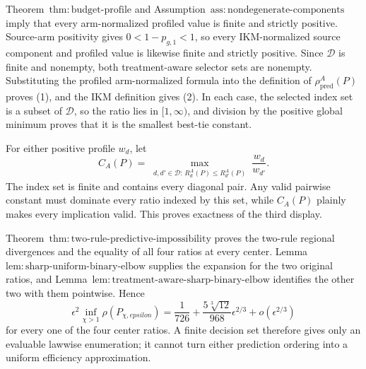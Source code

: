 Theorem~\(\mathrm{thm{:}budget\text{-}profile}\) and Assumption~\(\mathrm{ass{:}nondegenerate\text{-}components}\) imply that every arm-normalized profiled value is finite and strictly positive. Source-arm positivity gives \(0<1-p_{g,1}<1\), so every IKM-normalized source component and profiled value is likewise finite and strictly positive. Since \(\mathcal D\) is finite and nonempty, both treatment-aware selector sets are nonempty. Substituting the profiled arm-normalized formula into the definition of \(\rho_{\mathrm{pred}}^A(P)\) proves (1), and the IKM definition gives (2). In each case, the selected index set is a subset of \(\mathcal D\), so the ratio lies in \([1,\infty)\), and division by the positive global minimum proves that it is the smallest best-tie constant.

For either positive profile \(w_d\), let
\[
 C_A(P)=\max_{\substack{d,d'\in\mathcal D:\,R_d^A(P)\le R_{d'}^A(P)}}\frac{w_d}{w_{d'}}. \tag{1}
\]
The index set is finite and contains every diagonal pair. Any valid pairwise constant must dominate every ratio indexed by this set, while \(C_A(P)\) plainly makes every implication valid. This proves exactness of the third display.

Theorem~\(\mathrm{thm{:}two\text{-}rule\text{-}predictive\text{-}impossibility}\) proves the two-rule regional divergences and the equality of all four ratios at every center. Lemma~\(\mathrm{lem{:}sharp\text{-}uniform\text{-}binary\text{-}elbow}\) supplies the expansion for the two original ratios, and Lemma~\(\mathrm{lem{:}treatment\text{-}aware\text{-}sharp\text{-}binary\text{-}elbow}\) identifies the other two with them pointwise. Hence
\[
 \epsilon^2\inf_{\chi>1}\rho(P_{\chi,epsilon})
 =\frac1{726}+\frac{5\sqrt[3]{12}}{968}\epsilon^{2/3}+o(\epsilon^{2/3})
\]
for every one of the four center ratios. A finite decision set therefore gives only an evaluable lawwise enumeration; it cannot turn either prediction ordering into a uniform efficiency approximation.